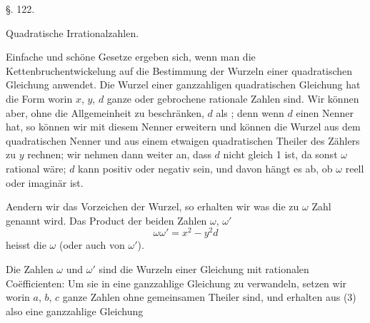 \begin{center}
§. 122.

Quadratische Irrationalzahlen.
\end{center}

Einfache und schöne Gesetze ergeben sich, wenn man die Kettenbruchentwickelung auf die Bestimmung der Wurzeln einer quadratischen Gleichung anwendet. Die Wurzel einer ganzzahligen quadratischen Gleichung hat die Form
worin $x$, $y$, $d$ ganze oder gebrochene rationale Zahlen sind. Wir können aber, ohne die Allgemeinheit zu beschränken, $d$ als ; denn wenn $d$ einen Nenner hat, so können wir mit diesem Nenner erweitern und können die Wurzel aus dem quadratischen Nenner und aus einem etwaigen quadratischen Theiler des Zählers zu $y$ rechnen; wir nehmen dann weiter an, dass $d$ nicht gleich 1 ist, da sonst $\omega$ rational wäre; $d$ kann positiv oder negativ sein, und davon hängt es ab, ob $\omega$ reell oder imaginär ist.

Aendern wir das Vorzeichen der Wurzel, so erhalten wir
was die zu $\omega$  Zahl genannt wird. Das Product der beiden Zahlen $\omega$, $\omega'$
\[
\omega\omega' = x^2 - y^2 d
\]
heisst die  $\omega$ (oder auch von $\omega'$). 

Die Zahlen $\omega$ und $\omega'$ sind die Wurzeln einer Gleichung mit rationalen Co\"efficienten:
Um sie in eine ganzzahlige Gleichung zu verwandeln, setzen wir
worin $a$, $b$, $c$ ganze Zahlen ohne gemeinsamen Theiler sind, und erhalten aus (3)
also eine ganzzahlige  Gleichung\par %
